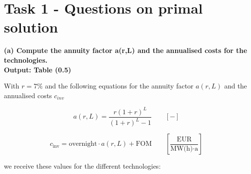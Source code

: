 \section{Task 1 - Questions on primal solution}

\textbf{
    (a) Compute the annuity factor a(r,L) and the annualised costs for the technologies. \\
    Output: Table (0.5)
    }

With $r=7\%$ and the following equations for the annuity factor $a(r,L)$ and the annualised costs $c_{inv}$ 

\begin{equation*}
    a(r,L) = \frac{r(1+r)^L}{(1+r)^L - 1} \qquad [-]
\end{equation*}

\begin{equation*}
    c_{\mathrm{inv}}
    = \mathrm{overnight} \cdot a(r,L)
    + \mathrm{FOM} \qquad \left[\frac{\text{EUR}}{\text{MW(h)}\cdot\text{a}}\right]
\end{equation*}

we receive these values for the different technologies:

